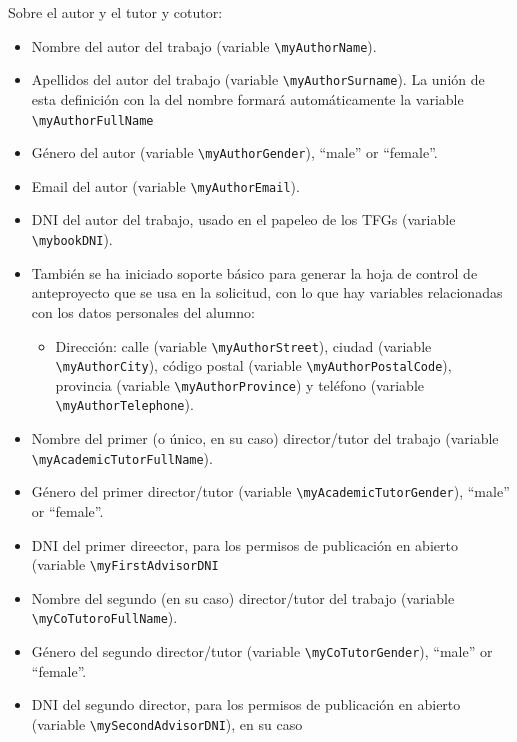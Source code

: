 \documentclass[spanish,openright]{book}
\begin{document}
Sobre el autor y el tutor y cotutor:

\begin{itemize}
  
\item Nombre del autor del trabajo (variable
  \texttt{\textbackslash{}myAuthorName}).
\item Apellidos del autor del trabajo (variable
  \texttt{\textbackslash{}myAuthorSurname}). La unión de esta
  definición con la del nombre formará automáticamente la variable
  \texttt{\textbackslash{}myAuthorFullName}
\item Género del autor (variable
  \texttt{\textbackslash{}myAuthorGender}), ``male'' or ``female''.
\item Email del autor (variable
  \texttt{\textbackslash{}myAuthorEmail}).
\item DNI del autor del trabajo, usado en el papeleo de los TFGs
  (variable \texttt{\textbackslash{}mybookDNI}).

\item También se ha iniciado soporte básico para generar la hoja de
  control de anteproyecto que se usa en la solicitud, con lo que hay
  variables relacionadas con los datos personales del alumno:

  \begin{itemize}
  \item Dirección: calle (variable \texttt{\textbackslash{}myAuthorStreet}),
    ciudad (variable \texttt{\textbackslash{}myAuthorCity}), código postal
    (variable \texttt{\textbackslash{}myAuthorPostalCode}), provincia (variable
    \texttt{\textbackslash{}myAuthorProvince}) y teléfono (variable
    \texttt{\textbackslash{}myAuthorTelephone}).
  \end{itemize}

\item Nombre del primer (o único, en su caso) director/tutor del trabajo
  (variable \texttt{\textbackslash{}myAcademicTutorFullName}).
\item Género del primer director/tutor (variable
  \texttt{\textbackslash{}myAcademicTutorGender}), ``male'' or
  ``female''.
\item DNI del primer direector, para los permisos de publicación en
  abierto (variable \texttt{\textbackslash{}myFirstAdvisorDNI}

  
\item Nombre del segundo (en su caso) director/tutor del trabajo (variable
  \texttt{\textbackslash{}myCoTutoroFullName}).
\item Género del segundo director/tutor (variable
  \texttt{\textbackslash{}myCoTutorGender}), ``male'' or
  ``female''.
\item DNI del segundo director, para los permisos de publicación en
  abierto (variable \texttt{\textbackslash{}mySecondAdvisorDNI}), en
  su caso

  \end{itemize}
\end{document}
